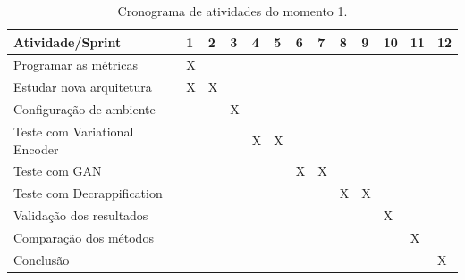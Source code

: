 \begin{table}[H]
  \centering
  \caption{Cronograma de atividades do momento 1.}
  \begin{tabular}{|l|l|l|l|l|l|l|l|l|l|l|l|l|}
  \hline
  \textbf{Atividade/Sprint}     & \textbf{1} & \textbf{2} & \textbf{3} & \textbf{4} & \textbf{5} & \textbf{6} & \textbf{7} & \textbf{8} & \textbf{9} & \textbf{10} & \textbf{11} & \textbf{12} \\ \hline
  Programar as métricas         & X          &            &            &            &            &            &            &            &            &             &             &             \\ \hline
  Estudar nova arquitetura      & X          & X          &            &            &            &            &            &            &            &             &             &             \\ \hline
  Configuração de ambiente      &            &            & X          &            &            &            &            &            &            &             &             &             \\ \hline
  Teste com Variational Encoder &            &            &            & X          & X          &            &            &            &            &             &             &             \\ \hline
  Teste com GAN                 &            &            &            &            &            & X          & X          &            &            &             &             &             \\ \hline
  Teste com Decrappification    &            &            &            &            &            &            &            & X          & X          &             &             &             \\ \hline
  Validação dos resultados      &            &            &            &            &            &            &            &            &            & X           &             &             \\ \hline
  Comparação dos métodos        &            &            &            &            &            &            &            &            &            &             & X           &             \\ \hline
  Conclusão                     &            &            &            &            &            &            &            &            &            &             &             & X           \\ \hline
  \end{tabular}
  \label{tab:step-2}
\end{table}